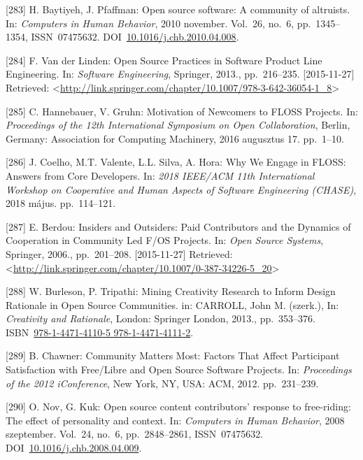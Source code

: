 \documentclass[12pt,magyar,a4paper,oneside]{scrreprt}
\newenvironment{cslreferences}%
  {}%
  {\par}
\begin{document}
\begin{cslreferences}
\leavevmode\hypertarget{ref-baytiyeh_open_2010}{}%
{[}283{]} H. Baytiyeh, J. Pfaffman: Open source software: A community of
altruists. In: \emph{Computers in Human Behavior}, 2010 november.
Vol.~26, no.~6, pp.~1345--1354, ISSN~07475632.
DOI~\href{https://doi.org/10.1016/j.chb.2010.04.008}{10.1016/j.chb.2010.04.008}.

\leavevmode\hypertarget{ref-van_der_linden_open_2013}{}%
{[}284{]} F. Van der Linden: Open Source Practices in Software Product
Line Engineering. In: \emph{Software Engineering}, Springer, 2013.,
pp.~216--235. {[}2015-11-27{]} Retrieved:
\textless{}\url{http://link.springer.com/chapter/10.1007/978-3-642-36054-1_8}\textgreater{}

\leavevmode\hypertarget{ref-hannebauer_motivation_2016}{}%
{[}285{]} C. Hannebauer, V. Gruhn: Motivation of Newcomers to FLOSS
Projects. In: \emph{Proceedings of the 12th International Symposium on
Open Collaboration}, Berlin, Germany: Association for Computing
Machinery, 2016 augusztus 17. pp.~1--10.

\leavevmode\hypertarget{ref-coelho_why_2018}{}%
{[}286{]} J. Coelho, M.T. Valente, L.L. Silva, A. Hora: Why We Engage in
FLOSS: Answers from Core Developers. In: \emph{2018 IEEE/ACM 11th
International Workshop on Cooperative and Human Aspects of Software
Engineering (CHASE)}, 2018 május. pp.~114--121.

\leavevmode\hypertarget{ref-berdou_insiders_2006}{}%
{[}287{]} E. Berdou: Insiders and Outsiders: Paid Contributors and the
Dynamics of Cooperation in Community Led F/OS Projects. In: \emph{Open
Source Systems}, Springer, 2006., pp.~201--208. {[}2015-11-27{]}
Retrieved:
\textless{}\url{http://link.springer.com/chapter/10.1007/0-387-34226-5_20}\textgreater{}

\leavevmode\hypertarget{ref-carroll_mining_2013}{}%
{[}288{]} W. Burleson, P. Tripathi: Mining Creativity Research to Inform
Design Rationale in Open Source Communities. in: CARROLL, John M.
(szerk.), In: \emph{Creativity and Rationale}, London: Springer London,
2013., pp.~353--376.
ISBN~\href{https://worldcat.org/isbn/978-1-4471-4110-5\%20978-1-4471-4111-2}{978-1-4471-4110-5 978-1-4471-4111-2}.

\leavevmode\hypertarget{ref-chawner_community_2012}{}%
{[}289{]} B. Chawner: Community Matters Most: Factors That Affect
Participant Satisfaction with Free/Libre and Open Source Software
Projects. In: \emph{Proceedings of the 2012 iConference}, New York, NY,
USA: ACM, 2012. pp.~231--239.

\leavevmode\hypertarget{ref-nov_open_2008}{}%
{[}290{]} O. Nov, G. Kuk: Open source content contributors' response to
free-riding: The effect of personality and context. In: \emph{Computers
in Human Behavior}, 2008 szeptember. Vol.~24, no.~6, pp.~2848--2861,
ISSN~07475632.
DOI~\href{https://doi.org/10.1016/j.chb.2008.04.009}{10.1016/j.chb.2008.04.009}.


\end{cslreferences}
\end{document}
